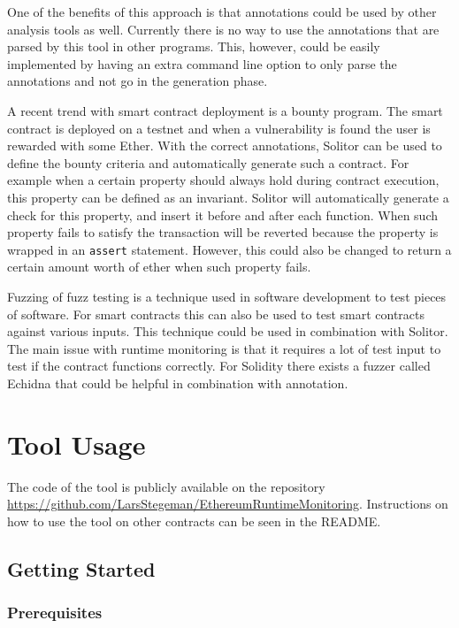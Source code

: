 \documentclass[a4paper]{article}
\begin{document}
One of the benefits of this approach is that annotations could be used by other analysis tools as well. Currently there is no way to use the annotations that are parsed by this tool in other programs. This, however, could be easily implemented by having an extra command line option to only parse the annotations and not go in the generation phase. \par
A recent trend with smart contract deployment is a bounty program. The smart contract is deployed on a testnet and when a vulnerability is found the user is rewarded with some Ether. With the correct annotations, Solitor can be used to define the bounty criteria and automatically generate such a contract. For example when a certain property should always hold during contract execution, this property can be defined as an invariant. Solitor will automatically generate a check for this property, and insert it before and after each function. When such property fails to satisfy the transaction will be reverted because the property is wrapped in an \texttt{assert} statement. However, this could also be changed to return a certain amount worth of ether when such property fails. \par
Fuzzing of fuzz testing is a technique used in software development to test pieces of software. For smart contracts this can also be used to test smart contracts against various inputs. This technique could be used in combination with Solitor. The main issue with runtime monitoring is that it requires a lot of test input to test if the contract functions correctly. For Solidity there exists a fuzzer called Echidna \cite{echidnafuzzer} that could be helpful in combination with annotation.

\newpage
\appendix
\section{Tool Usage}
The code of the tool is publicly available on the repository \url{https://github.com/LarsStegeman/EthereumRuntimeMonitoring}. Instructions on how to use the tool on other contracts can be seen in the README.

\hypertarget{getting-started}{%
\subsection{Getting Started}\label{getting-started}}

\hypertarget{prerequisites}{%
\subsubsection{Prerequisites}\label{prerequisites}}
\end{document}
